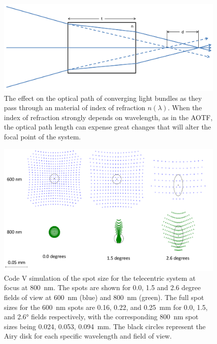 \begin{figure}
    \begin{center}
    \includegraphics[width=1.0\textwidth]{./Images/3-2-OpticalPathDisplacement.pdf}
    \caption[Telecentric Optical Path Displacement]{The effect on the optical path of converging light bundles as they pass through an material of index of refraction $n(\lambda)$. When the index of refraction strongly depends on wavelength, as in the AOTF, the optical path length can expense great changes that will alter the focal point of the system.}
    \label{fig:3.2:opticalPathDisplacement}
    \end{center}
\end{figure}

\begin{figure}
    \begin{center}
    \includegraphics[width=1.0\textwidth]{./Images/3-2-TelecentricSpotSize.pdf}
    \caption[Telecentric Prototype Spot Sizes]{Code V simulation of the spot size for the telecentric system at focus at 800~nm. The spots are shown for 0.0, 1.5 and 2.6 degree fields of view at 600~nm (blue) and 800~nm (green). The full spot sizes for the 600~nm spots are 0.16, 0.22, and 0.25~mm for 0.0, 1.5, and 2.6\si{\degree} fields respectively, with the corresponding 800~nm spot sizes being 0.024, 0.053, 0.094~mm. The black circles represent the Airy disk for each specific wavelength and field of view.}
    \label{fig:3.2:telecentricSpotSize}
    \end{center}
\end{figure}

